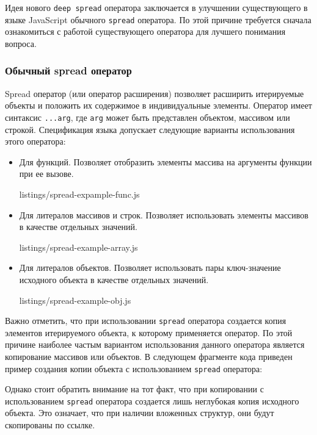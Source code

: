 \documentclass[14pt, a4paper]{article}
\def\code#1{\texttt{#1}} %
\begin{document}
Идея нового \code{deep spread} оператора заключается в улучшении существующего в языке JavaScript обычного \code{spread}
оператора. По этой причине требуется сначала ознакомиться с работой существующего оператора для лучшего понимания вопроса.

\subsubsection{Обычный spread оператор}
Spread оператор (или оператор расширения)\cite{spread_mozilla} позволяет расширить итерируемые объекты и положить их
содержимое в индивидуальные элементы. Оператор имеет синтаксис \code{...arg}, где
\code{arg} может быть представлен объектом, массивом или строкой. Спецификация языка допускает следующие
варианты использования этого оператора:
\begin{itemize}
  \item {Для функций. Позволяет отобразить элементы массива на аргументы функции при ее вызове.}
        
        {listings/spread-expample-func.js}
  \item {Для литералов массивов и строк. Позволяет использовать элементы массивов в качестве отдельных значений.}
        
        {listings/spread-example-array.js}
  \item {Для литералов объектов. Позволяет использовать пары ключ-значение исходного объекта в качестве отдельных значений.}
        
        {listings/spread-example-obj.js}
\end{itemize}
Важно отметить, что при использовании \code{spread} оператора создается копия элементов
итерируемого объекта, к которому применяется оператор. По этой причине наиболее частым вариантом
использования данного оператора является копирование массивов или объектов. В следующем фрагменте
кода приведен пример создания копии объекта с использованием \code{spread} оператора:

Однако стоит обратить внимание на тот факт, что при копировании с использованием \code{spread} оператора
создается лишь неглубокая копия исходного объекта. Это означает, что при наличии вложенных структур,
они будут скопированы по ссылке.
\end{document}
